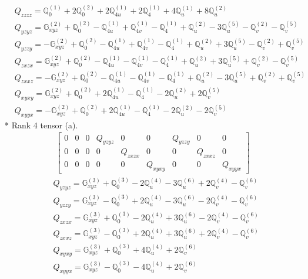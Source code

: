 \documentclass[fleqn,8pt,landscape]{jsarticle}
\begin{document}
\begin{align*}
& Q_{zzzz} = \mathbb{Q}_{0}^{(1)} + 2 \mathbb{Q}_{0}^{(2)} + 2 \mathbb{Q}_{4u}^{(1)} + 2 \mathbb{Q}_{4}^{(1)} + 4 \mathbb{Q}_{u}^{(1)} + 8 \mathbb{Q}_{u}^{(2)} \\
& Q_{yzyz} = \mathbb{G}_{xyz}^{(2)} + \mathbb{Q}_{0}^{(2)} - \mathbb{Q}_{4u}^{(1)} + \mathbb{Q}_{4v}^{(1)} - \mathbb{Q}_{4}^{(1)} + \mathbb{Q}_{u}^{(2)} - 3 \mathbb{Q}_{u}^{(5)} - \mathbb{Q}_{v}^{(2)} - \mathbb{Q}_{v}^{(5)} \\
& Q_{yzzy} = - \mathbb{G}_{xyz}^{(2)} + \mathbb{Q}_{0}^{(2)} - \mathbb{Q}_{4u}^{(1)} + \mathbb{Q}_{4v}^{(1)} - \mathbb{Q}_{4}^{(1)} + \mathbb{Q}_{u}^{(2)} + 3 \mathbb{Q}_{u}^{(5)} - \mathbb{Q}_{v}^{(2)} + \mathbb{Q}_{v}^{(5)} \\
& Q_{zxzx} = \mathbb{G}_{xyz}^{(2)} + \mathbb{Q}_{0}^{(2)} - \mathbb{Q}_{4u}^{(1)} - \mathbb{Q}_{4v}^{(1)} - \mathbb{Q}_{4}^{(1)} + \mathbb{Q}_{u}^{(2)} + 3 \mathbb{Q}_{u}^{(5)} + \mathbb{Q}_{v}^{(2)} - \mathbb{Q}_{v}^{(5)} \\
& Q_{zxxz} = - \mathbb{G}_{xyz}^{(2)} + \mathbb{Q}_{0}^{(2)} - \mathbb{Q}_{4u}^{(1)} - \mathbb{Q}_{4v}^{(1)} - \mathbb{Q}_{4}^{(1)} + \mathbb{Q}_{u}^{(2)} - 3 \mathbb{Q}_{u}^{(5)} + \mathbb{Q}_{v}^{(2)} + \mathbb{Q}_{v}^{(5)} \\
& Q_{xyxy} = \mathbb{G}_{xyz}^{(2)} + \mathbb{Q}_{0}^{(2)} + 2 \mathbb{Q}_{4u}^{(1)} - \mathbb{Q}_{4}^{(1)} - 2 \mathbb{Q}_{u}^{(2)} + 2 \mathbb{Q}_{v}^{(5)} \\
& Q_{xyyx} = - \mathbb{G}_{xyz}^{(2)} + \mathbb{Q}_{0}^{(2)} + 2 \mathbb{Q}_{4u}^{(1)} - \mathbb{Q}_{4}^{(1)} - 2 \mathbb{Q}_{u}^{(2)} - 2 \mathbb{Q}_{v}^{(5)}
\end{align*}
* Rank 4 tensor (a).
\begin{align*}
\begin{bmatrix} 0 & 0 & 0 & Q_{yzyz} & 0 & 0 & Q_{yzzy} & 0 & 0 \\ 0 & 0 & 0 & 0 & Q_{zxzx} & 0 & 0 & Q_{zxxz} & 0 \\ 0 & 0 & 0 & 0 & 0 & Q_{xyxy} & 0 & 0 & Q_{xyyx} \end{bmatrix}
\end{align*}
\begin{align*}
& Q_{yzyz} = \mathbb{G}_{xyz}^{(3)} + \mathbb{Q}_{0}^{(3)} - 2 \mathbb{Q}_{u}^{(4)} - 3 \mathbb{Q}_{u}^{(6)} + 2 \mathbb{Q}_{v}^{(4)} - \mathbb{Q}_{v}^{(6)} \\
& Q_{yzzy} = \mathbb{G}_{xyz}^{(3)} - \mathbb{Q}_{0}^{(3)} + 2 \mathbb{Q}_{u}^{(4)} - 3 \mathbb{Q}_{u}^{(6)} - 2 \mathbb{Q}_{v}^{(4)} - \mathbb{Q}_{v}^{(6)} \\
& Q_{zxzx} = \mathbb{G}_{xyz}^{(3)} + \mathbb{Q}_{0}^{(3)} - 2 \mathbb{Q}_{u}^{(4)} + 3 \mathbb{Q}_{u}^{(6)} - 2 \mathbb{Q}_{v}^{(4)} - \mathbb{Q}_{v}^{(6)} \\
& Q_{zxxz} = \mathbb{G}_{xyz}^{(3)} - \mathbb{Q}_{0}^{(3)} + 2 \mathbb{Q}_{u}^{(4)} + 3 \mathbb{Q}_{u}^{(6)} + 2 \mathbb{Q}_{v}^{(4)} - \mathbb{Q}_{v}^{(6)} \\
& Q_{xyxy} = \mathbb{G}_{xyz}^{(3)} + \mathbb{Q}_{0}^{(3)} + 4 \mathbb{Q}_{u}^{(4)} + 2 \mathbb{Q}_{v}^{(6)} \\
& Q_{xyyx} = \mathbb{G}_{xyz}^{(3)} - \mathbb{Q}_{0}^{(3)} - 4 \mathbb{Q}_{u}^{(4)} + 2 \mathbb{Q}_{v}^{(6)}
\end{align*}
\end{document}
